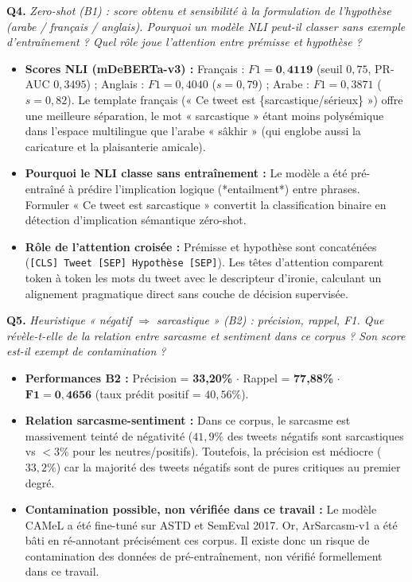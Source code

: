 \documentclass[10pt,a4paper]{article}
\newcommand{\questiontitle}[2]{%
  \noindent\textbf{#1.} \textit{#2}\par\vspace{1.5pt}%
}
\begin{document}
\questiontitle{Q4}{Zero-shot (B1) : score obtenu et sensibilité à la formulation de l'hypothèse (arabe / français / anglais). Pourquoi un modèle NLI peut-il classer sans exemple d'entraînement ? Quel rôle joue l'attention entre prémisse et hypothèse ?}
\begin{tcolorbox}[reponsebox]
  \begin{itemize}
    \item \textbf{Scores NLI (mDeBERTa-v3) :} Français : $F1 = \mathbf{0{,}4119}$ (seuil $0{,}75$, PR-AUC $0{,}3495$) ; Anglais : $F1 = 0{,}4040$ ($s=0{,}79$) ; Arabe : $F1 = 0{,}3871$ ($s=0{,}82$). Le template français (« Ce tweet est \{sarcastique/sérieux\} ») offre une meilleure séparation, le mot « sarcastique » étant moins polysémique dans l'espace multilingue que l'arabe « sâkhir » (qui englobe aussi la caricature et la plaisanterie amicale).
    \item \textbf{Pourquoi le NLI classe sans entraînement :} Le modèle a été pré-entraîné à prédire l'implication logique (*entailment*) entre phrases. Formuler « Ce tweet est sarcastique » convertit la classification binaire en détection d'implication sémantique zéro-shot.
    \item \textbf{Rôle de l'attention croisée :} Prémisse et hypothèse sont concaténées (\texttt{[CLS] Tweet [SEP] Hypothèse [SEP]}). Les têtes d'attention comparent token à token les mots du tweet avec le descripteur d'ironie, calculant un alignement pragmatique direct sans couche de décision supervisée.
  \end{itemize}
\end{tcolorbox}

\questiontitle{Q5}{Heuristique « négatif $\Rightarrow$ sarcastique » (B2) : précision, rappel, F1. Que révèle-t-elle de la relation entre sarcasme et sentiment dans ce corpus ? Son score est-il exempt de contamination ?}
\begin{tcolorbox}[reponsebox]
  \begin{itemize}
    \item \textbf{Performances B2 :} Précision = \textbf{33,20\%} $\cdot$ Rappel = \textbf{77,88\%} $\cdot$ $\mathbf{F1 = 0{,}4656}$ (taux prédit positif = $40{,}56\%$).
    \item \textbf{Relation sarcasme-sentiment :} Dans ce corpus, le sarcasme est massivement teinté de négativité ($41{,}9\%$ des tweets négatifs sont sarcastiques vs $<3\%$ pour les neutres/positifs). Toutefois, la précision est médiocre ($33{,}2\%$) car la majorité des tweets négatifs sont de pures critiques au premier degré.
    \item \textbf{Contamination possible, non vérifiée dans ce travail :} Le modèle CAMeL a été fine-tuné sur ASTD et SemEval 2017. Or, ArSarcasm-v1 a été bâti en ré-annotant précisément ces corpus. Il existe donc un risque de contamination des données de pré-entraînement, non vérifié formellement dans ce travail.
  \end{itemize}
\end{tcolorbox}
\end{document}
